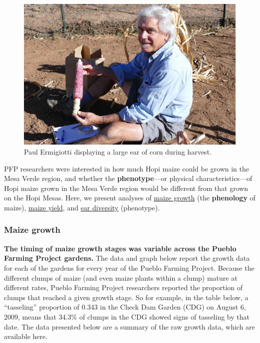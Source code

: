 \documentclass[12pt,]{article}
\begin{document}
\begin{figure}
\centering
\includegraphics{./images/section_5.2_header.jpg}
\caption{Paul Ermigiotti displaying a large ear of corn during harvest.}
\end{figure}

PFP researchers were interested in how much Hopi maize could be grown in the Mesa Verde region, and whether the \textbf{phenotype}---or physical characteristics---of Hopi maize grown in the Mesa Verde region would be different from that grown on the Hopi Mesas. Here, we present analyses of \protect\hyperlink{maize-growth}{maize growth} (the \textbf{phenology} of maize), \protect\hyperlink{maize-yield}{maize yield}, and \protect\hyperlink{ear-diversity}{ear diversity} (phenotype).

\hypertarget{maize-growth}{%
\subsubsection*{Maize growth}\label{maize-growth}}

\textbf{The timing of maize growth stages was variable across the Pueblo Farming Project gardens.} The data and graph below report the growth data for each of the gardens for every year of the Pueblo Farming Project. Because the different clumps of maize (and even maize plants within a clump) mature at different rates, Pueblo Farming Project researchers reported the proportion of clumps that reached a given growth stage. So for example, in the table below, a ``tasseling'' proportion of 0.343 in the Check Dam Garden (CDG) on August 6, 2009, means that 34.3\% of clumps in the CDG showed signs of tasseling by that date. The data presented below are a summary of the raw growth data, which are available here.
\end{document}
